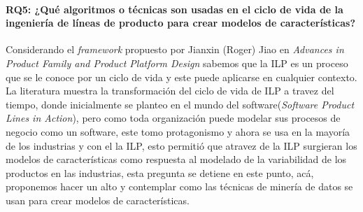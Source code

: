 \paragraph{RQ5: ¿Qué algoritmos o técnicas son usadas en el ciclo de vida de la ingeniería de líneas de producto para crear modelos de características?} 
Considerando el \textit{framework} propuesto por Jianxin (Roger) Jiao en \textit{Advances in Product Family and Product Platform Design}\cite{Simpson} sabemos que la ILP es un proceso que se le conoce por un ciclo de vida y este puede aplicarse en cualquier contexto. La literatura muestra la transformación del ciclo de vida de ILP a travez del tiempo, donde inicialmente se planteo en el mundo del software(\textit{Software Product Lines in Action}\cite{VanDerLinden2007}), pero como toda organización puede modelar sus procesos de negocio como un software, este tomo protagonismo y ahora se usa en la mayoría de los industrias y con el  la ILP, esto permitió que atravez de la ILP surgieran los modelos de características como respuesta al modelado de la variabilidad de los productos en las industrias, esta pregunta se detiene en este punto, acá, proponemos hacer un alto y contemplar como las técnicas de minería de datos se usan para crear modelos de características.
